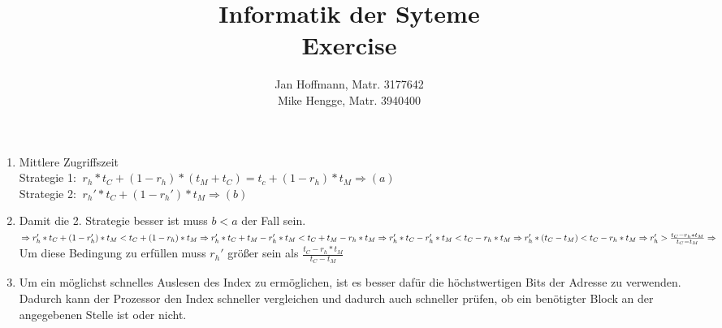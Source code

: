 \documentclass[10pt,a4paper]{article}
\title{Informatik der Syteme \\ Exercise \exnum}
\author{Jan Hoffmann, Matr. 3177642 \\ Mike Hengge,  Matr. 3940400}
\begin{document}
\section{}\label{sec:10.1}
	\begin{enumerate}
		\item Mittlere Zugriffszeit \\
					Strategie 1: $ \ r_h * t_C + (1 - r_h) * (t_M + t_C) = t_c + (1 - r_h) * t_M \Rightarrow    (a) $\\
					Strategie 2: $ \ r_h' * t_C + (1-r_h') * t_M \Rightarrow (b)$ 
		
		\item Damit die 2. Strategie besser ist muss $b < a$ der Fall sein.\\
					$\Rightarrow r_h' * t_C + (1 - r_h') * t_M < t_C + (1 - r_h) * t_M \\
					\Rightarrow r_h' * t_C + t_M - r_h' * t_M < t_C + t_M - r_h * t_M \\
					\Rightarrow r_h' * t_C - r_h' * t_M < t_C - r_h * t_M \\
					\Rightarrow r_h' * (t_C - t_M) < t_C - r_h * t_M \\
					\Rightarrow r_h' > \frac{t_C - r_h * t_M}{t_C - t_M} \\ 
					\Rightarrow $Um diese Bedingung zu erfüllen muss $ r_h' $ größer sein als $\frac{t_C - r_h * t_M}{t_C - t_M} $
					
		\item Um ein möglichst schnelles Auslesen des Index zu ermöglichen, ist es besser dafür die höchstwertigen Bits der Adresse zu verwenden. Dadurch kann der Prozessor den Index schneller vergleichen und dadurch auch schneller prüfen, ob ein benötigter Block an der angegebenen Stelle ist oder nicht.
		
											
	\end{enumerate}
\end{document}
